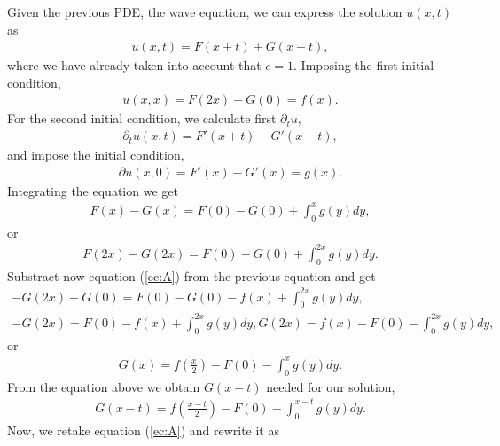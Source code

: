 \begin{questions}

\begin{solution}
Given the previous PDE, the wave equation, we can express the solution $u(x,t)$ as
\begin{align*}
u(x,t)=F(x+t)+G(x-t),
\end{align*}
where we have already taken into account that $c=1$. Imposing the first initial condition,
\begin{align}\label{ec:A}
u(x,x)=F(2x)+G(0)=f(x).
\end{align}
For the second initial condition, we calculate first $\partial_tu$,
\begin{align*}
\partial_tu(x,t)=F'(x+t)-G'(x-t),
\end{align*}
and impose the initial condition,
\begin{align*}
\partial u(x,0)=F'(x)-G'(x)=g(x).
\end{align*}
Integrating the equation we get
\begin{align*}
F(x)-G(x)=F(0)-G(0)+\int_0^xg(y)dy,
\end{align*}
or
\begin{align*}
F(2x)-G(2x)=F(0)-G(0)+\int_0^{2x}g(y)dy.
\end{align*}
Substract now equation (\ref{ec:A}) from the previous equation and get
\begin{align*}
-G(2x)-G(0)=F(0)-G(0)-f(x)+\int_0^{2x}g(y)dy,\\
-G(2x)=F(0)-f(x)+\int_0^{2x}g(y)dy,
G(2x)=f(x)-F(0)-\int_0^{2x}g(y)dy,
\end{align*}
or
\begin{align*}
G(x)=f(\frac{x}{2})-F(0)-\int_0^{x}g(y)dy.
\end{align*}
From the equation above we obtain $G(x-t)$ needed for our solution,
\begin{align*}
G(x-t)=f(\frac{x-t}{2})-F(0)-\int_0^{x-t}g(y)dy.
\end{align*}
Now, we retake equation (\ref{ec:A}) and rewrite it as

\end{solution}
\end{questions}
